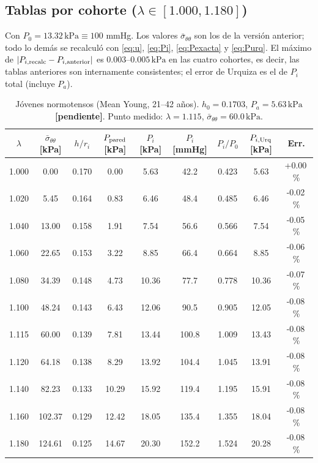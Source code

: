 \documentclass[11pt]{article}
\newcommand{\kPa}{\,\mathrm{kPa}}
\newcommand{\sbar}{\bar\sigma_{\theta\theta}}
\newcommand{\pend}{\textcolor{red!70!black}{\textbf{[pendiente]}}}
\begin{document}
\subsection{Tablas por cohorte ($\lambda\in[1.000,1.180]$)}
Con $P_0=13.32\kPa\equiv100$ mmHg. Los valores $\sbar$ son los de la versión anterior; todo lo demás se recalculó con \eqref{eq:u}, \eqref{eq:Pi}, \eqref{eq:Pexacta} y \eqref{eq:Purq}. El máximo de $|P_{i,\rm recalc}-P_{i,\rm anterior}|$ es $0.003$--$0.005\kPa$ en las cuatro cohortes, es decir, las tablas anteriores son internamente consistentes; el error de Urquiza es el de $P_i$ total (incluye $P_a$).
\def\tablehead{$\lambda$ & $\sbar$ [kPa] & $h/r_i$ & $P_{\rm pared}$ [kPa] & $P_i$ [kPa] & $P_i$ [mmHg] & $P_i/P_0$ & $P_{i,\rm Urq}$ [kPa] & Err.\\\midrule}
\begin{table}[H]\centering\footnotesize\setlength{\tabcolsep}{3pt}
\caption{Jóvenes normotensos (Mean Young, 21--42 años). $h_0=0.1703$, $P_a=5.63\kPa$ \pend. Punto medido: $\lambda=1.115$, $\sbar=60.0\kPa$.}
\begin{tabular}{ccccccccc}\toprule\tablehead1.000 & 0.00 & 0.170 & 0.00 & 5.63 & 42.2 & 0.423 & 5.63 & +0.00\,\% \\
1.020 & 5.45 & 0.164 & 0.83 & 6.46 & 48.4 & 0.485 & 6.46 & -0.02\,\% \\
1.040 & 13.00 & 0.158 & 1.91 & 7.54 & 56.6 & 0.566 & 7.54 & -0.05\,\% \\
1.060 & 22.65 & 0.153 & 3.22 & 8.85 & 66.4 & 0.664 & 8.85 & -0.06\,\% \\
1.080 & 34.39 & 0.148 & 4.73 & 10.36 & 77.7 & 0.778 & 10.36 & -0.07\,\% \\
1.100 & 48.24 & 0.143 & 6.43 & 12.06 & 90.5 & 0.905 & 12.05 & -0.08\,\% \\
1.115 & 60.00 & 0.139 & 7.81 & 13.44 & 100.8 & 1.009 & 13.43 & -0.08\,\% \\
1.120 & 64.18 & 0.138 & 8.29 & 13.92 & 104.4 & 1.045 & 13.91 & -0.08\,\% \\
1.140 & 82.23 & 0.133 & 10.29 & 15.92 & 119.4 & 1.195 & 15.91 & -0.08\,\% \\
1.160 & 102.37 & 0.129 & 12.42 & 18.05 & 135.4 & 1.355 & 18.04 & -0.08\,\% \\
1.180 & 124.61 & 0.125 & 14.67 & 20.30 & 152.2 & 1.524 & 20.28 & -0.08\,\% \\
\bottomrule\end{tabular}\end{table}
\end{document}
